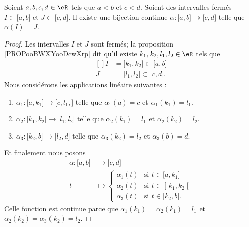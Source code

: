 \begin{lemma}	\label{LEMooRWKAooLRdUdr}
	Soient \( a,b,c,d\in \eR\) tels que \( a<b\) et \( c<d\). Soient des intervalles fermés \( I\subset\mathopen[ a,b\mathclose] \) et \( J\subset\mathopen[ c,d\mathclose]\). Il existe une bijection continue \(\alpha \colon \mathopen[ a,b\mathclose]\to  \mathopen[ c,d\mathclose] \) telle que \( \alpha(I)=J\).
\end{lemma}

\begin{proof}
	Les intervalles \( I\) et \( J\) sont fermés; la proposition \ref{PROPooBWXYooDcwXrp} dit qu'il existe \( k_1,k_2,l_1,l_2\in \eR\) tels que
	\begin{equation}
		\begin{aligned}[]
			I & =\mathopen[ k_1,k_2\mathclose]\subset \mathopen[ a,b\mathclose]  \\
			J & =\mathopen[ l_1,l_2\mathclose]\subset \mathopen[ c,d\mathclose].
		\end{aligned}
	\end{equation}
	Nous considérons les applications linéaire suivantes :
	\begin{enumerate}
		\item
		      \(\alpha_1 \colon \mathopen[ a,k_1\mathclose]\to \mathopen[ c,l_1,\mathclose]  \) telle que \( \alpha_1(a)=c\) et \( \alpha_1(k_1)=l_1\).
		\item
		      \(\alpha_2 \colon \mathopen[ k_1,k_2\mathclose]\to \mathopen[ l_1,l_2\mathclose]  \) telle que \( \alpha_2(k_1)=l_1\) et \( \alpha_2(k_2)=l_2\).
		\item
		      \(\alpha_3 \colon \mathopen[ k_2,b\mathclose]\to \mathopen[ l_2,d\mathclose]  \) telle que \( \alpha_3(k_2)=l_2\) et \( \alpha_3(b)=d\).
	\end{enumerate}
	Et finalement nous posons
	\begin{equation}
		\begin{aligned}
			\alpha\colon \mathopen[ a,b\mathclose] & \to\mathopen[ c,d\mathclose]                                      \\
			t                                      & \mapsto \begin{cases}
				                                                 \alpha_1(t) & \text{si } t\in\mathopen[ a,k_1\mathclose]  \\
				                                                 \alpha_2(t) & \text{si }t\in\mathopen] k_1,k_2\mathclose[ \\
				                                                 \alpha_3(t) & \text{si }t\in\mathopen[ k_2,b\mathclose].
			                                                 \end{cases}
		\end{aligned}
	\end{equation}
	Celle fonction est continue parce que  \( \alpha_1(k_1)=\alpha_2(k_1)=l_1\) et \( \alpha_2(k_2)=\alpha_3(k_2)=l_2\).
\end{proof}


